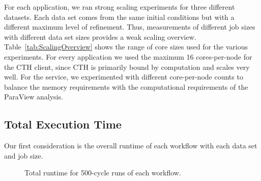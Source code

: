 
For each application, we ran strong scaling experiments for three different
datasets.  Each data set comes from the same initial conditions but with a
different maximum level of refinement.  Thus, measurements of different job
sizes with different data set sizes provides a weak scaling overview.
Table~\ref{tab:ScalingOverview} shows the range of core sizes used for the
various experiments.  For every application we used the maximum 16
cores-per-node for the CTH client, since CTH is primarily bound by
computation and scales very well.  For the \intransit service, we
experimented with different core-per-node counts to balance the memory
requirements with the computational requirements of the ParaView analysis.



\subsection{Total Execution Time}
\label{sec:TotalExecutionTime}

Our first consideration is the overall runtime of each workflow with each
data set and job size.

\begin{figure}[htbp]
\begin{centering}
\vspace{-6pt}

\vspace{-6pt}

\vspace{-6pt}
\caption[Total runtime.]{Total runtime for 500-cycle runs of each
  workflow.}
\label{fig:runtime-individual}
\end{centering}
\end{figure}

